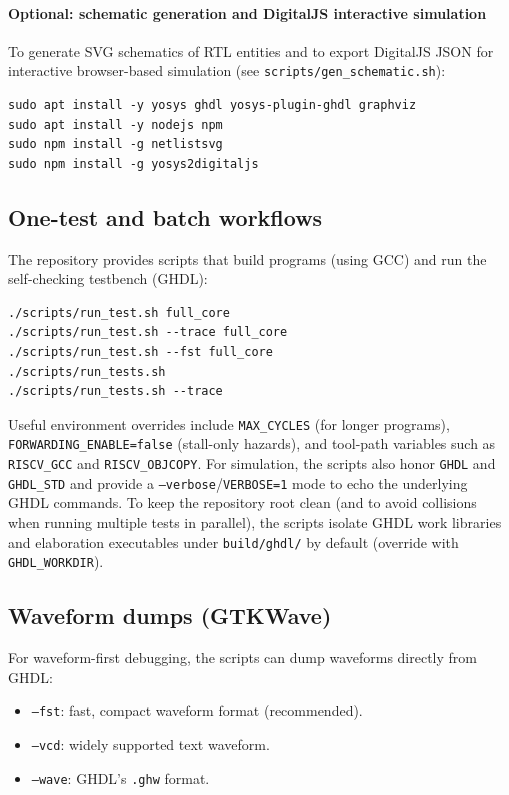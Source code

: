 \paragraph{Optional: schematic generation and DigitalJS interactive simulation}
To generate SVG schematics of RTL entities and to export DigitalJS JSON for
interactive browser-based simulation (see \texttt{scripts/gen\_schematic.sh}):
\begin{lstlisting}[style=minrv]
sudo apt install -y yosys ghdl yosys-plugin-ghdl graphviz
sudo apt install -y nodejs npm
sudo npm install -g netlistsvg
sudo npm install -g yosys2digitaljs
\end{lstlisting}

\subsection{One-test and batch workflows}
The repository provides scripts that build programs (using GCC) and run the
self-checking testbench (GHDL):

\begin{lstlisting}[style=minrv]
./scripts/run_test.sh full_core
./scripts/run_test.sh --trace full_core
./scripts/run_test.sh --fst full_core
./scripts/run_tests.sh
./scripts/run_tests.sh --trace
\end{lstlisting}

Useful environment overrides include \texttt{MAX\_CYCLES} (for longer programs),
\texttt{FORWARDING\_ENABLE=false} (stall-only hazards), and tool-path variables
such as \texttt{RISCV\_GCC} and \texttt{RISCV\_OBJCOPY}. For simulation, the
scripts also honor \texttt{GHDL} and \texttt{GHDL\_STD} and provide a
\texttt{--verbose}/\texttt{VERBOSE=1} mode to echo the underlying GHDL commands.
To keep the repository root clean (and to avoid collisions when running multiple
tests in parallel), the scripts isolate GHDL work libraries and elaboration
executables under \texttt{build/ghdl/} by default (override with
\texttt{GHDL\_WORKDIR}).

\subsection{Waveform dumps (GTKWave)}
For waveform-first debugging, the scripts can dump waveforms directly from GHDL:
\begin{itemize}[leftmargin=*]
  \item \texttt{--fst}: fast, compact waveform format (recommended).
  \item \texttt{--vcd}: widely supported text waveform.
  \item \texttt{--wave}: GHDL's \texttt{.ghw} format.
\end{itemize}


